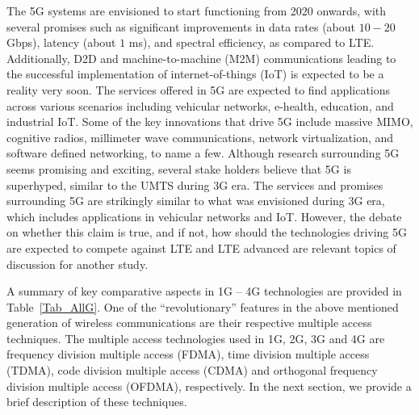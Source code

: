 \begin{multicols}{2}
The 5G systems are envisioned to start functioning from 2020 onwards, with several promises such as significant improvements in data rates (about $10-20$ Gbps), latency (about $1$ ms), and spectral efficiency, as compared to LTE. Additionally, D2D and machine-to-machine (M2M) communications leading to the successful implementation of internet-of-things (IoT) is expected to be a reality very soon. The services offered in 5G are expected to find applications across various scenarios including vehicular networks, e-health, education, and industrial IoT. Some of the key innovations that drive 5G include massive MIMO, cognitive radios, millimeter wave communications, network virtualization, and software defined networking, to name a few. Although research surrounding 5G seems promising and exciting, several stake holders believe that 5G is superhyped, similar to the UMTS during 3G era. The services and promises surrounding 5G are strikingly similar to what was envisioned during 3G era, which includes applications in vehicular networks and IoT. However, the debate on whether this claim is true, and if not, how should the technologies driving 5G are expected to compete against LTE and LTE advanced are relevant topics of discussion for another study.

A summary of key comparative aspects in 1G -- 4G technologies are provided in Table~\ref{Tab_AllG}. One of the ``revolutionary'' features in the above mentioned generation of wireless communications are their respective multiple access techniques. The multiple access technologies used in 1G, 2G, 3G and 4G are frequency division multiple access (FDMA), time division multiple access (TDMA), code division multiple access (CDMA) and orthogonal frequency division multiple access (OFDMA), respectively. In the next section, we provide a brief description of these techniques.
\end{multicols} 

